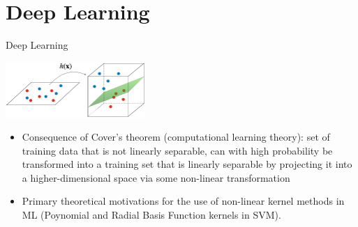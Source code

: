 \section{Deep Learning}

\begin{frame}{Deep Learning}
  

    \begin{center}\includegraphics[width=200px]{img/projection.png}\end{center}
    \vspace{0.5cm}
    \begin{itemize}
        \item Consequence of Cover's theorem (computational learning theory): set of training data that is not linearly separable, can with high probability be transformed into a training set that is linearly separable by projecting it into a higher-dimensional space via some non-linear transformation
        \item Primary theoretical motivations for the use of non-linear kernel methods in ML (Poynomial and Radial Basis Function kernels in SVM).
    \end{itemize}
  
  
  \end{frame}

